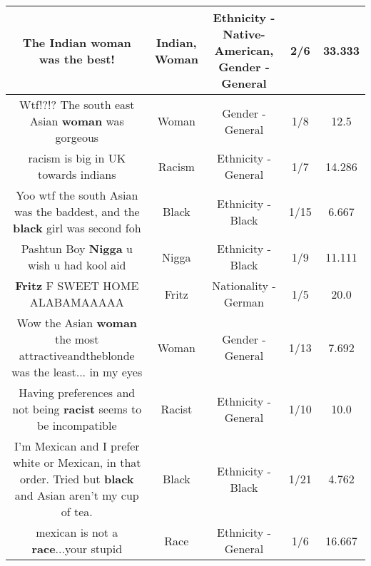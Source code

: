 \documentclass[11pt]{article}
\newlength\mylength
\begin{document}
\begin{center}
\begin{longtable}{|C{.65\mylength}|C{.30\mylength}|C{.12\mylength}|C{.12\mylength}|C{.12\mylength}|}
  \small The \textbf{Indian} \textbf{woman} was the best!\normalsize   & Indian, Woman & Ethnicity - Native-American, Gender - General & 2/6 & 33.333 \\  \hline
  \small Wtf!?!? The south east Asian \textbf{woman} was gorgeous\normalsize   & Woman & Gender - General & 1/8 & 12.5 \\  \hline
  \small racism is big in UK towards indians\normalsize   & Racism & Ethnicity - General & 1/7 & 14.286 \\  \hline
  \small Yoo wtf the south Asian was the baddest, and the \textbf{black} girl was second foh\normalsize   & Black & Ethnicity - Black & 1/15 & 6.667 \\  \hline
  \small Pashtun Boy \textbf{Nigga} u wish u had kool aid\normalsize   & Nigga & Ethnicity - Black & 1/9 & 11.111 \\  \hline
  \small \@\textbf{Fritz} F SWEET HOME ALABAMAAAAA\normalsize   & Fritz & Nationality - German & 1/5 & 20.0 \\  \hline
  \small Wow the Asian \textbf{woman} the most attractiveandtheblonde was the least... in my eyes\normalsize   & Woman & Gender - General & 1/13 & 7.692 \\  \hline
  \small Having preferences and not being \textbf{racist} seems to be incompatible\normalsize   & Racist & Ethnicity - General & 1/10 & 10.0 \\  \hline
  \small I'm Mexican and I prefer white or Mexican, in that order. Tried but \textbf{black} and Asian aren't my cup of tea.\normalsize   & Black & Ethnicity - Black & 1/21 & 4.762 \\  \hline
  \small mexican is not a \textbf{race}...your stupid\normalsize   & Race & Ethnicity - General & 1/6 & 16.667 \\  \hline

\end{longtable}
\end{center}
\end{document}
